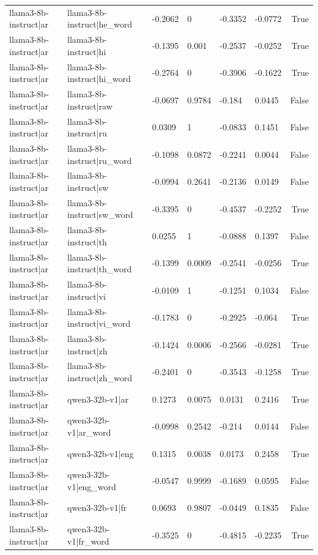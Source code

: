 \begin{table}
\begin{tabular}{llllllr}
llama3-8b-instruct|ar & llama3-8b-instruct|he_word & -0.2062 & 0 & -0.3352 & -0.0772 & True \\
llama3-8b-instruct|ar & llama3-8b-instruct|hi & -0.1395 & 0.001 & -0.2537 & -0.0252 & True \\
llama3-8b-instruct|ar & llama3-8b-instruct|hi_word & -0.2764 & 0 & -0.3906 & -0.1622 & True \\
llama3-8b-instruct|ar & llama3-8b-instruct|raw & -0.0697 & 0.9784 & -0.184 & 0.0445 & False \\
llama3-8b-instruct|ar & llama3-8b-instruct|ru & 0.0309 & 1 & -0.0833 & 0.1451 & False \\
llama3-8b-instruct|ar & llama3-8b-instruct|ru_word & -0.1098 & 0.0872 & -0.2241 & 0.0044 & False \\
llama3-8b-instruct|ar & llama3-8b-instruct|sw & -0.0994 & 0.2641 & -0.2136 & 0.0149 & False \\
llama3-8b-instruct|ar & llama3-8b-instruct|sw_word & -0.3395 & 0 & -0.4537 & -0.2252 & True \\
llama3-8b-instruct|ar & llama3-8b-instruct|th & 0.0255 & 1 & -0.0888 & 0.1397 & False \\
llama3-8b-instruct|ar & llama3-8b-instruct|th_word & -0.1399 & 0.0009 & -0.2541 & -0.0256 & True \\
llama3-8b-instruct|ar & llama3-8b-instruct|vi & -0.0109 & 1 & -0.1251 & 0.1034 & False \\
llama3-8b-instruct|ar & llama3-8b-instruct|vi_word & -0.1783 & 0 & -0.2925 & -0.064 & True \\
llama3-8b-instruct|ar & llama3-8b-instruct|zh & -0.1424 & 0.0006 & -0.2566 & -0.0281 & True \\
llama3-8b-instruct|ar & llama3-8b-instruct|zh_word & -0.2401 & 0 & -0.3543 & -0.1258 & True \\
llama3-8b-instruct|ar & qwen3-32b-v1|ar & 0.1273 & 0.0075 & 0.0131 & 0.2416 & True \\
llama3-8b-instruct|ar & qwen3-32b-v1|ar_word & -0.0998 & 0.2542 & -0.214 & 0.0144 & False \\
llama3-8b-instruct|ar & qwen3-32b-v1|eng & 0.1315 & 0.0038 & 0.0173 & 0.2458 & True \\
llama3-8b-instruct|ar & qwen3-32b-v1|eng_word & -0.0547 & 0.9999 & -0.1689 & 0.0595 & False \\
llama3-8b-instruct|ar & qwen3-32b-v1|fr & 0.0693 & 0.9807 & -0.0449 & 0.1835 & False \\
llama3-8b-instruct|ar & qwen3-32b-v1|fr_word & -0.3525 & 0 & -0.4815 & -0.2235 & True \\

\end{tabular}
\end{table}
